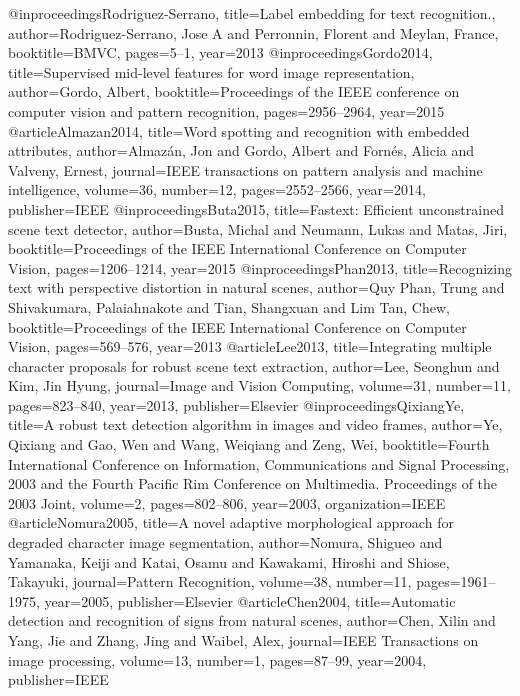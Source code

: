 @inproceedings{Rodriguez-Serrano,
  title={Label embedding for text recognition.},
  author={Rodriguez-Serrano, Jose A and Perronnin, Florent and Meylan, France},
  booktitle={BMVC},
  pages={5--1},
  year={2013}
}
@inproceedings{Gordo2014,
  title={Supervised mid-level features for word image representation},
  author={Gordo, Albert},
  booktitle={Proceedings of the IEEE conference on computer vision and pattern recognition},
  pages={2956--2964},
  year={2015}
}
@article{Almazan2014,
  title={Word spotting and recognition with embedded attributes},
  author={Almaz{\'a}n, Jon and Gordo, Albert and Forn{\'e}s, Alicia and Valveny, Ernest},
  journal={IEEE transactions on pattern analysis and machine intelligence},
  volume={36},
  number={12},
  pages={2552--2566},
  year={2014},
  publisher={IEEE}
}
@inproceedings{Buta2015,
  title={Fastext: Efficient unconstrained scene text detector},
  author={Busta, Michal and Neumann, Lukas and Matas, Jiri},
  booktitle={Proceedings of the IEEE International Conference on Computer Vision},
  pages={1206--1214},
  year={2015}
}
@inproceedings{Phan2013,
  title={Recognizing text with perspective distortion in natural scenes},
  author={Quy Phan, Trung and Shivakumara, Palaiahnakote and Tian, Shangxuan and Lim Tan, Chew},
  booktitle={Proceedings of the IEEE International Conference on Computer Vision},
  pages={569--576},
  year={2013}
}
@article{Lee2013,
  title={Integrating multiple character proposals for robust scene text extraction},
  author={Lee, Seonghun and Kim, Jin Hyung},
  journal={Image and Vision Computing},
  volume={31},
  number={11},
  pages={823--840},
  year={2013},
  publisher={Elsevier}
}
@inproceedings{QixiangYe,
  title={A robust text detection algorithm in images and video frames},
  author={Ye, Qixiang and Gao, Wen and Wang, Weiqiang and Zeng, Wei},
  booktitle={Fourth International Conference on Information, Communications and Signal Processing, 2003 and the Fourth Pacific Rim Conference on Multimedia. Proceedings of the 2003 Joint},
  volume={2},
  pages={802--806},
  year={2003},
  organization={IEEE}
}
@article{Nomura2005,
  title={A novel adaptive morphological approach for degraded character image segmentation},
  author={Nomura, Shigueo and Yamanaka, Keiji and Katai, Osamu and Kawakami, Hiroshi and Shiose, Takayuki},
  journal={Pattern Recognition},
  volume={38},
  number={11},
  pages={1961--1975},
  year={2005},
  publisher={Elsevier}
}
@article{Chen2004,
  title={Automatic detection and recognition of signs from natural scenes},
  author={Chen, Xilin and Yang, Jie and Zhang, Jing and Waibel, Alex},
  journal={IEEE Transactions on image processing},
  volume={13},
  number={1},
  pages={87--99},
  year={2004},
  publisher={IEEE}
}
